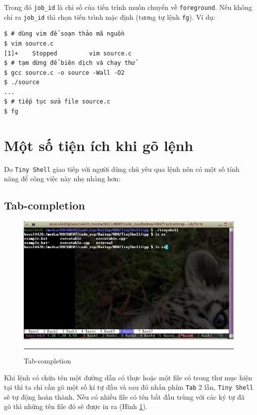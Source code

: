 \documentclass[a4paper,12pt]{report}
\begin{document}
	    Trong đó \texttt{job\_id} là chỉ số của tiến trình muốn chuyển về
	    \texttt{foreground}. Nếu không chỉ ra \texttt{job\_id} thì chọn
	    tiến trình mặc định (tương tự lệnh \texttt{fg}). Ví dụ:
	    \begin{verbatim}
$ # dùng vim để soạn thảo mã nguồn
$ vim source.c
[1]+    Stopped         vim source.c
$ # tạm dừng để biên dịch và chạy thử
$ gcc source.c -o source -Wall -O2
$ ./source
...
$ # tiếp tục sửa file source.c
$ fg
	    \end{verbatim}

    \section{Một số tiện ích khi gõ lệnh}
        Do \texttt{Tiny Shell} giao tiếp với người dùng chủ yếu qua lệnh nên có
        một số tính năng để công việc này nhẹ nhàng hơn:
        \subsection{Tab-completion}
        \begin{figure}
            \centering
            \includegraphics[scale=0.7]{ts2}
            \rule{35em}{0.5pt}
            \caption{Tab-completion}
            \label{fig:ts2}
        \end{figure}
        Khi lệnh có chứa tên một đường dẫn có thực hoặc một file có trong
        thư mục hiện tại thì ta chỉ cần gõ một số kí tự đầu và sau đó nhấn
        phím \texttt{Tab} 2 lần, \texttt{Tiny Shell} sẽ tự động hoàn thành.
        Nếu có nhiều file có tên bắt đầu trùng với các ký tự đã gõ thì
        những tên file đó sẽ được in ra (Hình \ref{fig:ts2}).
\end{document}
